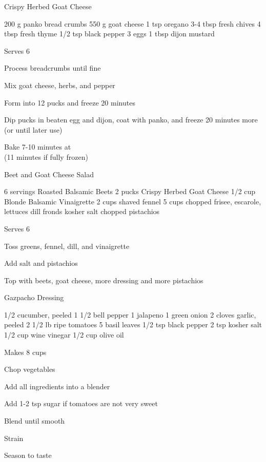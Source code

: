 \begin{recipe}{Crispy Herbed Goat Cheese}{}
\begin{ingredients}
200 g panko bread crumbs
550 g goat cheese
1 tsp oregano
3-4 tbsp fresh chives
4 tbsp fresh thyme
1/2 tsp black pepper
3 eggs
1 tbsp dijon mustard
\end{ingredients}
\nextcolumn
Serves 6
\begin{steps}
\item Process breadcrumbs until fine
\item Mix goat cheese, herbs, and pepper
\item Form into 12 pucks and freeze 20 minutes
\item Dip pucks in beaten egg and dijon, coat with panko, and freeze 20 minutes more \\(or until later use)
\item Bake 7-10 minutes at  \\(11 minutes if fully frozen)
\end{steps}
\end{recipe}

\begin{denserecipe}{Beet and Goat Cheese Salad}{}
\begin{ingredients}
6 servings Roasted Balsamic Beets
2 pucks Crispy Herbed Goat Cheese
1/2 cup Blonde Balsamic Vinaigrette
2 cups shaved fennel
5 cups chopped frisee, escarole, lettuces
dill fronds
kosher salt
chopped pistachios
\end{ingredients}
\nextcolumn
Serves 6
\begin{steps}
\item Toss greens, fennel, dill, and vinaigrette
\item Add salt and pistachios
\item Top with beets, goat cheese, more dressing and more pistachios
\end{steps}
\end{denserecipe}

\begin{recipe}{Gazpacho Dressing}{}
\begin{ingredients}
1/2 cucumber, peeled
1 1/2 bell pepper
1 jalapeno
1 green onion
2 cloves garlic, peeled
2 1/2 lb ripe tomatoes
5 basil leaves
1/2 tsp black pepper
2 tsp kosher salt
1/2 cup wine vinegar
1/2 cup olive oil
\end{ingredients}
\nextcolumn
Makes 8 cups
\begin{steps}
    \item Chop vegetables
    \item Add all ingredients into a blender 
    \item Add 1-2 tsp sugar if tomatoes are not very sweet
    \item Blend until smooth
    \item Strain
    \item Season to taste
\end{steps}
\end{recipe}

